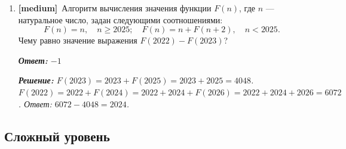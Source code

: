 \documentclass[a4paper]{article}
\newcommand{\medtag}{\textcolor{medcolor}{\textbf{[medium]}}}
\newcommand{\answer}[1]{\par\smallskip\textit{\textbf{Ответ:} #1}}
\newcommand{\solution}[1]{\par\textit{\textbf{Решение:} #1}}
\begin{document}
\begin{enumerate}[label=\textbf{Задача \arabic*.}, leftmargin=*, itemsep=10mm]
  \bigskip

  \item %
  \medtag\ Алгоритм вычисления значения функции $F(n)$, где $n$ — натуральное число,
  задан следующими соотношениями:
  \[
    F(n) = n,\quad n \geq 2025;\quad F(n) = n + F(n+2),\quad n < 2025.
  \]
  Чему равно значение выражения $F(2022) - F(2023)$?
  \answer{$-1$}
  \solution{$F(2023) = 2023 + F(2025) = 2023 + 2025 = 4048$. $F(2022) = 2022 + F(2024) = 2022 + 2024 + F(2026) = 2022+2024+2026=6072$. Ответ: $6072 - 4048 = 2024$.}

\end{enumerate}

\bigskip


\subsection*{\textcolor{hardcolor}{Сложный уровень}}
\end{document}
